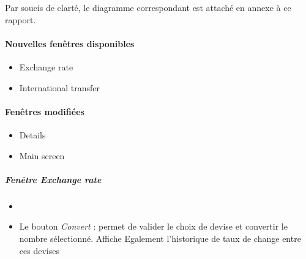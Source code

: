Par soucis de clarté, le diagramme correspondant est attaché en annexe à ce rapport.

\paragraph{Nouvelles fenêtres disponibles}
\begin{itemize}
    \item Exchange rate
    \item International transfer
\end{itemize}

\paragraph{Fenêtres modifiées}
\begin{itemize}
    \item Details
    \item Main screen
\end{itemize}

\subparagraph{Fenêtre Exchange rate}
\begin{itemize}
    \item {}
    \item Le bouton \emph{Convert} : permet de valider le choix de devise et convertir le nombre sélectionné. Affiche Egalement l'historique de taux de change entre ces devises
\end{itemize}

